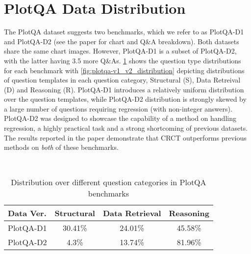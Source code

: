 \documentclass[runningheads]{llncs}
\newcommand\our[1][]{CRCT\xspace}
\begin{document}
\section{PlotQA Data Distribution}
The PlotQA dataset suggests two benchmarks, which we refer to as PlotQA-D1 and PlotQA-D2 (see the paper for chart and Q\&A breakdown). Both datasets share the same chart images. However, PlotQA-D1 is a subset of PlotQA-D2, with the latter having 3.5 more Q\&As. \cref{table:plotqa_question_distribution} shows the question type distributions for each benchmark with \cref{fig:plotqa-v1_v2_distribution} depicting distributions of question templates in each question category, Structural (S), Data Retreival (D) and Reasoning (R). PlotQA-D1 introduces a relatively uniform distribution over the question templates, while PlotQA-D2 distribution is strongly skewed by a large number of questions requiring regression (with non-integer answers). PlotQA-D2 was designed to showcase the capability of a method on handling regression, a highly practical task and a strong shortcoming of previous datasets. The results reported in the paper demonstrate that \our outperforms previous methods on \emph{both} of these benchmarks.
\begin{figure*}[ht]
  \centering
  \hfill
   \\
    \caption{PlotQA-D1 and D2 question type distributions. While in Structural questions the distribution is similar, in Data Retrieval and Reasoning questions, PlotQA-D2 is skewed towards few specific templates, which require a regression answer. }
\label{fig:plotqa-v1_v2_distribution}
\end{figure*}




\begin{table}[ht]
\begin{center}
\caption{Distribution over different question categories in PlotQA benchmarks}
\vspace{5mm}
\begin{tabular}{@{}lccc@{}}
\toprule
Data Ver. & \multicolumn{1}{l}{Structural} & \multicolumn{1}{l}{Data Retrieval} & \multicolumn{1}{l}{Reasoning} \\ \midrule
PlotQA-D1 & 30.41\%                        & 24.01\%                            & 45.58\%                       \\
PlotQA-D2 & 4.3\%                          & 13.74\%                            & 81.96\%                       \\ \bottomrule
\end{tabular}
\label{table:plotqa_question_distribution}


\end{center}

\end{table}
\end{document}

